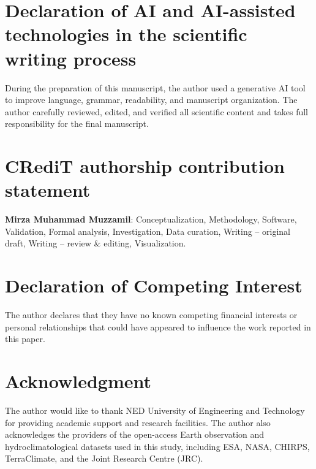 \documentclass[preprint,12pt]{elsarticle}
\begin{document}
\section*{Declaration of AI and AI-assisted technologies in the scientific writing process}
During the preparation of this manuscript, the author used a generative AI tool to improve language, grammar, readability, and manuscript organization. The author carefully reviewed, edited, and verified all scientific content and takes full responsibility for the final manuscript.

\section*{CRediT authorship contribution statement}
\textbf{Mirza Muhammad Muzzamil}: Conceptualization, Methodology, Software, Validation, Formal analysis, Investigation, Data curation, Writing -- original draft, Writing -- review \& editing, Visualization.

\section*{Declaration of Competing Interest}
The author declares that they have no known competing financial interests or personal relationships that could have appeared to influence the work reported in this paper.

\section*{Acknowledgment}

The author would like to thank NED University of Engineering and Technology for providing academic support and research facilities. The author also acknowledges the providers of the open-access Earth observation and hydroclimatological datasets used in this study, including ESA, NASA, CHIRPS, TerraClimate, and the Joint Research Centre (JRC).



\end{document}
